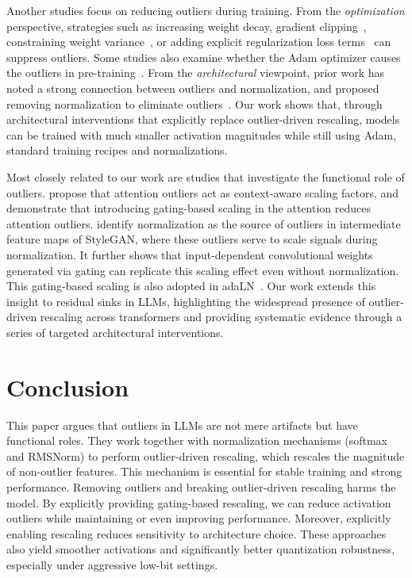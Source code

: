 \documentclass{article} %
\begin{document}
Another studies focus on reducing outliers during training. 
From the \textit{optimization} perspective, strategies such as increasing weight decay, gradient clipping~\citep{ahmadian2023intriguing}, constraining weight variance~\citep{owen2025variance,owen2025refined,xie2026controlled}, or adding explicit regularization loss terms~\citep{liang2025tweo} can suppress outliers. 
Some studies also examine whether the Adam optimizer causes the outliers in pre-training~\citep{kaul2024attention, he2024understanding, xie2026controlled}. 
From the \textit{architectural} viewpoint, prior work has noted a strong connection between outliers and normalization, and proposed removing normalization to eliminate outliers~\citep{he2024understanding,owen2025refined,owen2025variance}. 
Our work shows that, through architectural interventions that explicitly replace outlier-driven rescaling, models can be trained with much smaller activation magnitudes while still using Adam, standard training recipes and normalizations.

Most closely related to our work are studies that investigate the functional role of outliers. 
\citet{bondarenko2023quantizable, an2025systematic} propose that attention outliers act as context-aware scaling factors, and demonstrate that introducing gating-based scaling in the attention reduces attention outliers. 
\citet{karras2020analyzing} identify normalization as the source of outliers in intermediate feature maps of StyleGAN, where these outliers serve to scale signals during normalization. 
It further shows that input-dependent convolutional weights generated via gating can replicate this scaling effect even without normalization.
This gating-based scaling is also adopted in adaLN~\citep{perez2018film,xu2019understanding,peebles2023scalable,karras2024analyzing}. 
Our work extends this insight to residual sinks in LLMs, highlighting the widespread presence of outlier-driven rescaling across transformers and providing systematic evidence through a series of targeted architectural interventions.


\section{Conclusion}

This paper argues that outliers in LLMs are not mere artifacts but have functional roles.
They work together with normalization mechanisms (softmax and RMSNorm) to perform outlier-driven rescaling, which rescales the magnitude of non-outlier features. 
This mechanism is essential for stable training and strong performance. 
Removing outliers and breaking outlier-driven rescaling harms the model.
By explicitly providing gating-based rescaling, we can reduce activation outliers while maintaining or even improving performance.
Moreover, explicitly enabling rescaling reduces sensitivity to
architecture choice.
These approaches also yield smoother activations and significantly better quantization robustness, especially under aggressive low-bit settings.
\end{document}
